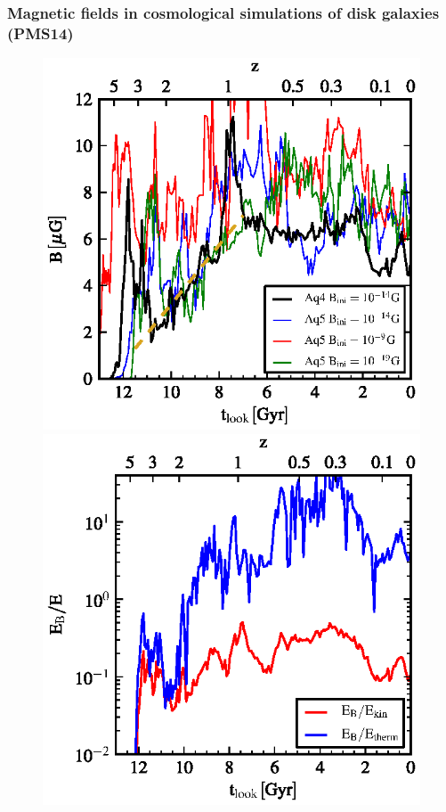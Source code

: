 \documentclass[10pt,aspectratio=169]{beamer}
\begin{document}
\begin{frame}
	\frametitle{Magnetic fields in cosmological simulations of disk galaxies (PMS14)}
	\begin{figure}
		\begin{minipage}[b]{0.32\linewidth}
			\centering
			\includegraphics[width=\textwidth]{images/pakmor_apjl_2014/bfield_evol_Aq-A_4}
		\end{minipage}
		\begin{minipage}[b]{0.32\linewidth}
			\centering
			\includegraphics[width=\textwidth]{images/pakmor_apjl_2014/energyrel_evol_Aq-A_4}

\end{minipage}
\end{figure}
\end{frame}
\end{document}
